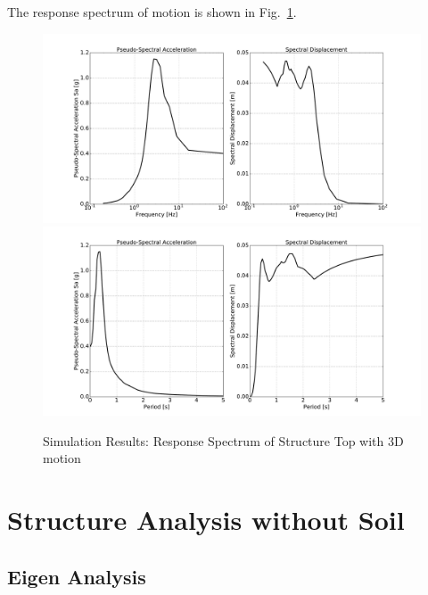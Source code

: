 The response spectrum of motion is shown in Fig.~\ref{fig_spectrum_freq_period_time_series_ssi3d_3D_motion}.
\begin{figure}[H]
  \centering
  \includegraphics[width = 15cm]{./Figure-files/nonlinear_analysis_steps/soil-structure-3D-ans/shell_structure_motion_node_3195_x_spectrum_freq.pdf}
  \includegraphics[width = 15cm]{./Figure-files/nonlinear_analysis_steps/soil-structure-3D-ans/shell_structure_motion_node_3195_x_spectrum_period.pdf}
  \caption{Simulation Results: Response Spectrum of Structure Top with 3D motion}
  \label{fig_spectrum_freq_period_time_series_ssi3d_3D_motion}
\end{figure}


\clearpage
\newpage
\section{Structure Analysis without Soil}
\label{structure_only_3D}

\subsection{Eigen Analysis}

